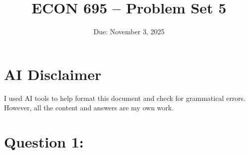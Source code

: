 \documentclass[12pt]{article}
\title{ECON 695 -- Problem Set 5}
\date{Due: November 3, 2025}
\begin{document}
\maketitle

\section*{AI Disclaimer}
I used AI tools to help format this document and check for grammatical errors. However, all the content and answers are my own work. 

\section*{Question 1: }
\end{document}
